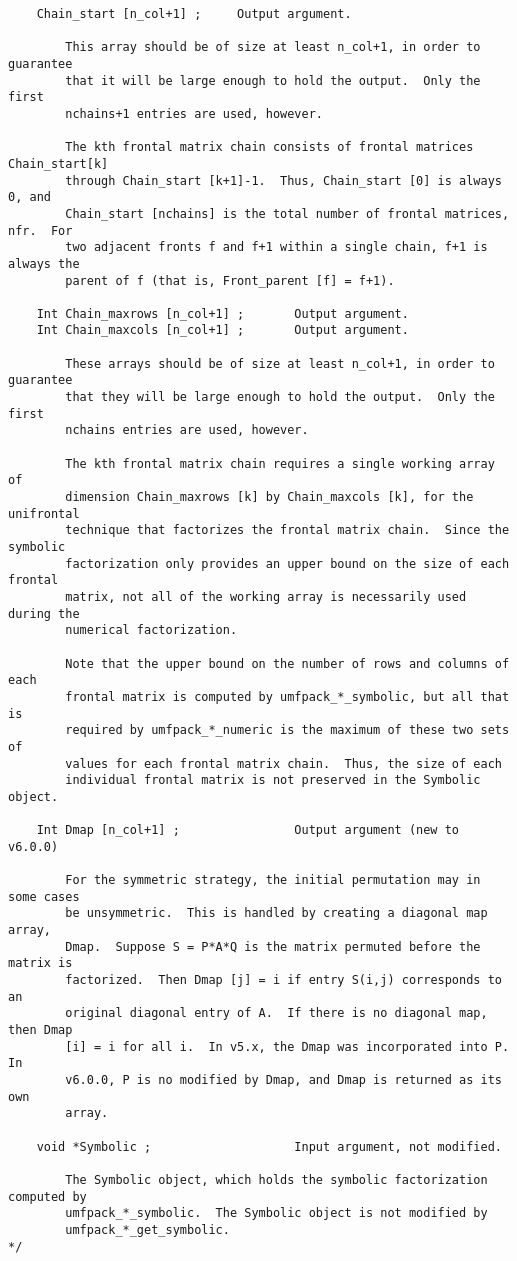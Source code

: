 \documentclass[11pt]{article}
\begin{document}
{\begin{verbatim}
    Chain_start [n_col+1] ;     Output argument.

        This array should be of size at least n_col+1, in order to guarantee
        that it will be large enough to hold the output.  Only the first
        nchains+1 entries are used, however.

        The kth frontal matrix chain consists of frontal matrices Chain_start[k]
        through Chain_start [k+1]-1.  Thus, Chain_start [0] is always 0, and
        Chain_start [nchains] is the total number of frontal matrices, nfr.  For
        two adjacent fronts f and f+1 within a single chain, f+1 is always the
        parent of f (that is, Front_parent [f] = f+1).

    Int Chain_maxrows [n_col+1] ;       Output argument.
    Int Chain_maxcols [n_col+1] ;       Output argument.

        These arrays should be of size at least n_col+1, in order to guarantee
        that they will be large enough to hold the output.  Only the first
        nchains entries are used, however.

        The kth frontal matrix chain requires a single working array of
        dimension Chain_maxrows [k] by Chain_maxcols [k], for the unifrontal
        technique that factorizes the frontal matrix chain.  Since the symbolic
        factorization only provides an upper bound on the size of each frontal
        matrix, not all of the working array is necessarily used during the
        numerical factorization.

        Note that the upper bound on the number of rows and columns of each
        frontal matrix is computed by umfpack_*_symbolic, but all that is
        required by umfpack_*_numeric is the maximum of these two sets of
        values for each frontal matrix chain.  Thus, the size of each
        individual frontal matrix is not preserved in the Symbolic object.

    Int Dmap [n_col+1] ;                Output argument (new to v6.0.0)

        For the symmetric strategy, the initial permutation may in some cases
        be unsymmetric.  This is handled by creating a diagonal map array,
        Dmap.  Suppose S = P*A*Q is the matrix permuted before the matrix is
        factorized.  Then Dmap [j] = i if entry S(i,j) corresponds to an
        original diagonal entry of A.  If there is no diagonal map, then Dmap
        [i] = i for all i.  In v5.x, the Dmap was incorporated into P.  In
        v6.0.0, P is no modified by Dmap, and Dmap is returned as its own
        array.

    void *Symbolic ;                    Input argument, not modified.

        The Symbolic object, which holds the symbolic factorization computed by
        umfpack_*_symbolic.  The Symbolic object is not modified by
        umfpack_*_get_symbolic.
*/
\end{verbatim}
}
\end{document}
